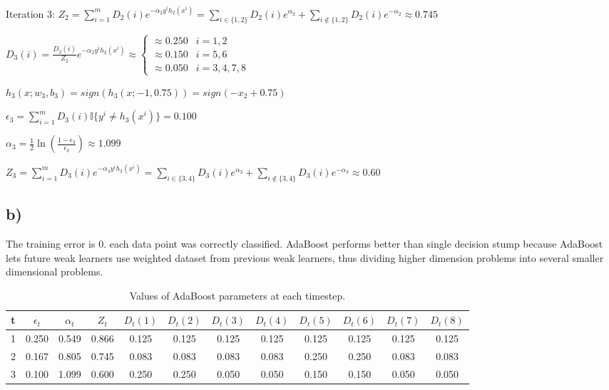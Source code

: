 \documentclass[
]{article}
\begin{document}
Iteration 3:
\(Z_2 = \sum_{i=1}^m D_2(i)e^{-\alpha_2 y^i h_2(x^i)} = \sum_{i\in\{1,2\}} D_2(i)e^{\alpha_2} + \sum_{i\notin \{1,2\}} D_2(i)e^{-\alpha_2} \approx 0.745\)

\(D_3(i) = \frac{D_2(i)}{Z_2}e^{-\alpha_2 y^i h_2(x^i)} \approx \left\{ \begin{array}{lcr} \approx 0.250 & i =1,2 \\ \approx 0.150 & i =5,6 \\ \approx 0.050 & i = 3,4,7,8 \end{array}\right.\)

\(h_3(x; w_3, b_3) = sign(h_3(x; -1, 0.75)) = sign( - x_2 + 0.75)\)

\(\epsilon_3 = \sum_{i=1}^m D_3(i) \mathbb{I}\{y^i \neq h_3 (x^i)\} = 0.100\)

\(\alpha_3 = \frac 1 2 \ln(\frac{1-\epsilon_3}{\epsilon_3}) \approx 1.099\)

\(Z_3 = \sum_{i=1}^m D_3(i)e^{-\alpha_3 y^i h_3(x^i)} = \sum_{i\in\{3,4\}} D_3(i)e^{\alpha_3} + \sum_{i\notin \{3,4\}} D_3(i)e^{-\alpha_3} \approx 0.60\)

\hypertarget{b-1}{%
\subsection{b)}\label{b-1}}

The training error is 0. each data point was correctly classified.
AdaBoost performs better than single decision stump because AdaBoost
lets future weak learners use weighted dataset from previous weak
learners, thus dividing higher dimension problems into several smaller
dimensional problems.

\usepackage{dblfloatfix}
\begin{table}[!b]
\begin{center}
\caption{Values of AdaBoost parameters at each timestep.}
\vspace{0.1in}
\begin{tabular}{|c|c|c|c|c|c|c|c|c|c|c|c|}\hline
t & $\epsilon_t$ & $\alpha_t$ & $Z_t$ & $D_t(1)$ & $D_t(2)$ & $D_t(3)$ & $D_t(4)$ & $D_t(5)$ & $D_t(6)$ & $D_t(7)$ & $D_t(8)$ \\\hline
1 & 0.250 & 0.549 & 0.866 &0.125 &0.125 &0.125 &0.125 & 0.125&0.125 &0.125 & 0.125\\
2 & 0.167 & 0.805 & 0.745 & 0.083 & 0.083 & 0.083 & 0.083 & 0.250 & 0.250 & 0.083 & 0.083 \\
3 & 0.100 & 1.099 & 0.600 & 0.250 & 0.250 & 0.050 & 0.050 & 0.150 & 0.150 & 0.050 & 0.050 \\\hline
\end{tabular}
\end{center}
\end{table}
\end{document}
